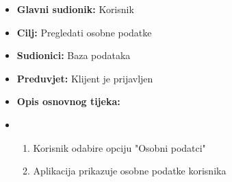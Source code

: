                         \noindent {}
					\begin{itemize}
	
						\item \textbf{Glavni sudionik: }Korisnik
						\item  \textbf{Cilj:} Pregledati osobne podatke
						\item  \textbf{Sudionici:} Baza podataka
						\item  \textbf{Preduvjet:} Klijent je prijavljen
						\item  \textbf{Opis osnovnog tijeka:}
						
						\item[] \begin{enumerate}
							\item Korisnik odabire opciju "Osobni podatci"
                                \item Aplikacija prikazuje osobne podatke korisnika\\
						\end{enumerate}
			
						
					\end{itemize}

